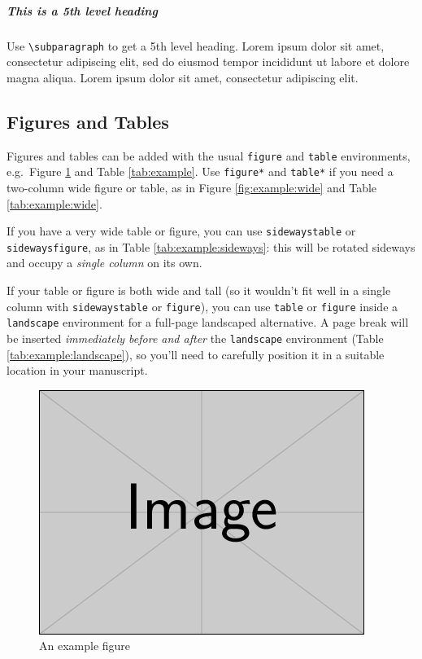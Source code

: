 \documentclass[a4paper,num-refs]{oup-contemporary}
\begin{document}
\subparagraph{This is a 5th level heading}

Use \verb|\subparagraph| to get a 5th level heading.
Lorem ipsum dolor sit amet, consectetur adipiscing elit, sed do eiusmod tempor incididunt ut labore et dolore magna aliqua. Lorem ipsum dolor sit amet, consectetur adipiscing elit.


\subsection{Figures and Tables}
Figures and tables can be added with the usual \verb|figure| and \verb|table| environments, e.g.~Figure \ref{fig:example} and Table \ref{tab:example}. Use \verb|figure*| and \verb|table*| if you need a two-column wide figure or table, as in Figure \ref{fig:example:wide} and Table \ref{tab:example:wide}.

If you have a very wide table or figure, you can use \texttt{sidewaystable} or \texttt{sidewaysfigure}, as in Table \ref{tab:example:sideways}: this will be rotated sideways and occupy a \emph{single column} on its own.

If your table or figure is both wide and tall (so it wouldn't fit well in a single column with \texttt{sidewaystable} or \texttt{figure}),
you can use \verb|table| or \verb|figure| inside a \verb|landscape| environment for a full-page landscaped alternative. A page break will be inserted \emph{immediately before and after} the \verb|landscape| environment (Table \ref{tab:example:landscape}), so you'll need to carefully position it in a suitable location in your manuscript.

\begin{figure}[bt!] %
\centering
\includegraphics[width=\linewidth]{example-image}
\caption{An example figure}\label{fig:example}
\end{figure}
\end{document}
